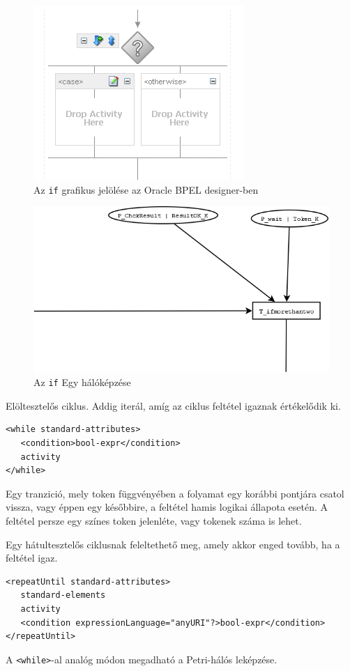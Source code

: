 \begin{figure}[h!]
\centering
\includegraphics[scale=1]{images/if.png}
\caption{Az \texttt{if} grafikus jelölése az Oracle BPEL designer-ben}
\label{fig:if}
\end{figure}


\begin{figure}[h!]
\centering
\includegraphics[scale=0.4]{images/ifnet.png}
\caption{Az \texttt{if} Egy hálóképzése}
\label{fig:ifnet}
\end{figure}

Elöltesztelős ciklus. Addig iterál, amíg az ciklus feltétel igaznak értékelődik ki. 
\begin{verbatim}
<while standard-attributes>
   <condition>bool-expr</condition>
   activity
</while>
\end{verbatim}
Egy tranzició, mely token függvényében a folyamat egy korábbi pontjára csatol vissza, vagy éppen egy későbbire, a feltétel hamis logikai állapota esetén. A feltétel persze egy színes token jelenléte, vagy tokenek száma is lehet. 

Egy hátultesztelős ciklusnak feleltethető meg, amely akkor enged tovább, ha a feltétel igaz. 
\begin{verbatim}
<repeatUntil standard-attributes>
   standard-elements
   activity
   <condition expressionLanguage="anyURI"?>bool-expr</condition>
</repeatUntil>
\end{verbatim}
A \texttt{<while>}-al analóg módon megadható a Petri-hálós leképzése.

